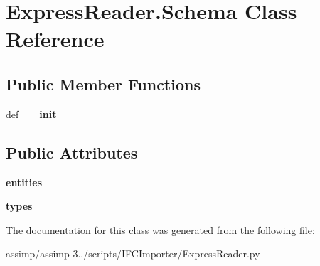 \hypertarget{class_express_reader_1_1_schema}{\section{Express\+Reader.\+Schema Class Reference}
\label{class_express_reader_1_1_schema}
}
\subsection*{Public Member Functions}
\begin{DoxyCompactItemize}
\item 
\hypertarget{class_express_reader_1_1_schema_a4579ee99dab0e10a05e196a0155cb896}{def {\bfseries \+\_\+\+\_\+init\+\_\+\+\_\+}}\label{class_express_reader_1_1_schema_a4579ee99dab0e10a05e196a0155cb896}

\end{DoxyCompactItemize}
\subsection*{Public Attributes}
\begin{DoxyCompactItemize}
\item 
\hypertarget{class_express_reader_1_1_schema_ad57480708a2af76d5b39121354a12ecc}{{\bfseries entities}}\label{class_express_reader_1_1_schema_ad57480708a2af76d5b39121354a12ecc}

\item 
\hypertarget{class_express_reader_1_1_schema_a84d56d2311c73478ea7bfa043f1b4407}{{\bfseries types}}\label{class_express_reader_1_1_schema_a84d56d2311c73478ea7bfa043f1b4407}

\end{DoxyCompactItemize}


The documentation for this class was generated from the following file\+:\begin{DoxyCompactItemize}
\item 
assimp/assimp-\/3../scripts/\+I\+F\+C\+Importer/Express\+Reader.\+py\end{DoxyCompactItemize}
